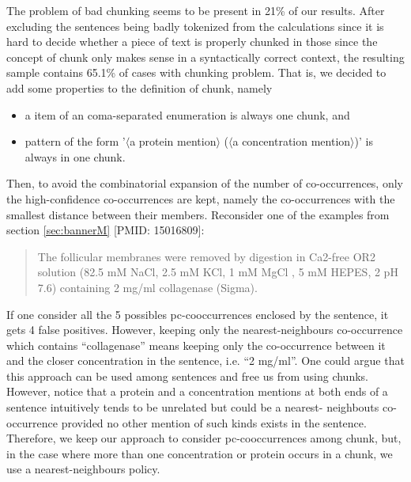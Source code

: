 The problem of bad chunking seems to be present in 21\% of our results.
After excluding 
the sentences being badly tokenized from the calculations since it is hard to decide whether a piece of text is properly chunked in those since the concept of chunk only makes sense in a syntactically correct context, 
the resulting sample contains 65.1\% of cases with chunking problem. That is, we decided to add some properties to the definition of chunk, namely
\begin{itemize}
\item a item of an coma-separated enumeration is always one chunk, and
\item pattern of the form '$\langle$a protein mention$\rangle$ ($\langle$a concentration mention$\rangle$)' is always in one chunk.
\end{itemize}
Then, to avoid the combinatorial expansion of the number of co-occurrences, only the high-confidence co-occurrences are kept, namely the co-occurrences with the smallest
distance between their members. Reconsider one of the examples from section
\ref{sec:bannerM} [PMID: 15016809]:
\begin{quote}
The follicular membranes were removed by digestion in Ca2-free OR2 solution ({\color{blue}82.5 mM} NaCl, {\color{blue}2.5 mM} KCl, {\color{blue}1 mM} MgCl , {\color{blue}5 mM} HEPES, 2 pH 7.6) containing {\color{blue}2 mg/ml} {\color{red}collagenase} (Sigma). 
\end{quote}
If one consider all the 5 possibles pc-cooccurrences enclosed by the sentence, it
gets 4 false positives. However, keeping only the nearest-neighbours co-occurrence which contains ``{\color{red}collagenase}'' means keeping only the co-occurrence between it and the closer concentration in the sentence, i.e. ``{\color{blue}2 mg/ml}''. One could argue that this approach can be used among sentences and free us from using chunks. However, notice that a protein and a concentration mentions at both ends of a sentence intuitively tends to be unrelated but could be a nearest-
neighbouts co-occurrence provided no other mention of such kinds exists in the 
sentence. Therefore, we keep our approach to consider pc-cooccurrences among 
chunk, but, in the case where more than one concentration or protein occurs in a 
chunk, we use a nearest-neighbours policy.
